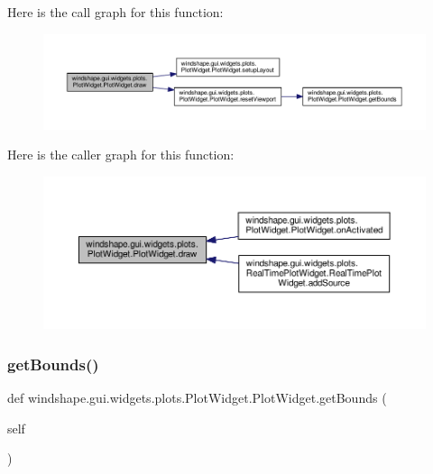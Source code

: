 Here is the call graph for this function\+:\nopagebreak
\begin{figure}[H]
\begin{center}
\leavevmode
\includegraphics[width=350pt]{classwindshape_1_1gui_1_1widgets_1_1plots_1_1_plot_widget_1_1_plot_widget_adf6ec722eec97f5f3c670b7cc9e7b1c1_cgraph}
\end{center}
\end{figure}
Here is the caller graph for this function\+:\nopagebreak
\begin{figure}[H]
\begin{center}
\leavevmode
\includegraphics[width=350pt]{classwindshape_1_1gui_1_1widgets_1_1plots_1_1_plot_widget_1_1_plot_widget_adf6ec722eec97f5f3c670b7cc9e7b1c1_icgraph}
\end{center}
\end{figure}
\mbox{\label{classwindshape_1_1gui_1_1widgets_1_1plots_1_1_plot_widget_1_1_plot_widget_a7afbd6a1cb3fde419ba5d829b2937122}} 
\subsubsection{\texorpdfstring{get\+Bounds()}{getBounds()}}
{\footnotesize\ttfamily def windshape.\+gui.\+widgets.\+plots.\+Plot\+Widget.\+Plot\+Widget.\+get\+Bounds (\begin{DoxyParamCaption}\item[{}]{self }\end{DoxyParamCaption})}

